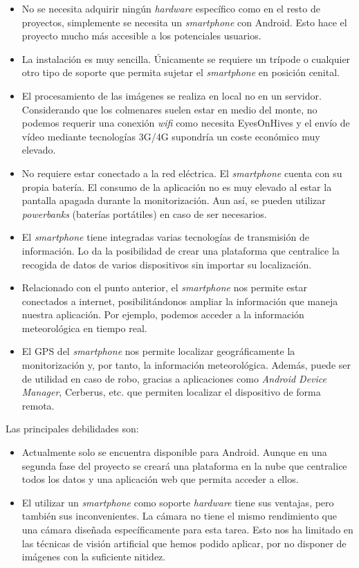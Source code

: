 \begin{itemize}
\tightlist
\item
  No se necesita adquirir ningún \emph{hardware} específico como en el
  resto de proyectos, simplemente se necesita un \emph{smartphone} con
  Android. Esto hace el proyecto mucho más accesible a los potenciales
  usuarios.
\item
  La instalación es muy sencilla. Únicamente se requiere un trípode o
  cualquier otro tipo de soporte que permita sujetar el
  \emph{smartphone} en posición cenital.
\item
  El procesamiento de las imágenes se realiza en local no en un
  servidor. Considerando que los colmenares suelen estar en medio del
  monte, no podemos requerir una conexión \emph{wifi} como necesita
  EyesOnHives y el envío de vídeo mediante tecnologías 3G/4G supondría
  un coste económico muy elevado.
\item
  No requiere estar conectado a la red eléctrica. El \emph{smartphone}
  cuenta con su propia batería. El consumo de la aplicación no es muy
  elevado al estar la pantalla apagada durante la monitorización. Aun
  así, se pueden utilizar \emph{powerbanks} (baterías portátiles) en
  caso de ser necesarios.
\item
  El \emph{smartphone} tiene integradas varias tecnologías de
  transmisión de información. Lo da la posibilidad de crear una
  plataforma que centralice la recogida de datos de varios dispositivos
  sin importar su localización.
\item
  Relacionado con el punto anterior, el \emph{smartphone} nos permite
  estar conectados a internet, posibilitándonos ampliar la información
  que maneja nuestra aplicación. Por ejemplo, podemos acceder a la
  información meteorológica en tiempo real.
\item
  El GPS del \emph{smartphone} nos permite localizar geográficamente la
  monitorización y, por tanto, la información meteorológica. Además,
  puede ser de utilidad en caso de robo, gracias a aplicaciones como
  \emph{Android Device Manager}, Cerberus, etc. que permiten localizar
  el dispositivo de forma remota.
\end{itemize}

Las principales debilidades son:

\begin{itemize}
\tightlist
\item
  Actualmente solo se encuentra disponible para Android. Aunque en una
  segunda fase del proyecto se creará una plataforma en la nube que
  centralice todos los datos y una aplicación web que permita acceder a
  ellos.
\item
  El utilizar un \emph{smartphone} como soporte \emph{hardware} tiene
  sus ventajas, pero también sus inconvenientes. La cámara no tiene el
  mismo rendimiento que una cámara diseñada específicamente para esta
  tarea. Esto nos ha limitado en las técnicas de visión artificial que
  hemos podido aplicar, por no disponer de imágenes con la suficiente
  nitidez.
\end{itemize}
